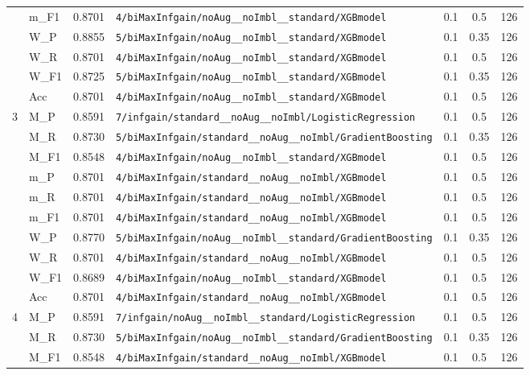 \begin{table}[htbp]
\begin{tabular}{|c|l|c|>{\ttfamily\footnotesize}p{7.2cm}|c|c|c|}
 & m\_F1 & 0.8701 & \texttt{4/biMaxInfgain/noAug\_\_noImbl\_\_standard/XGBmodel} & 0.1 & 0.5  & 126 \\ 
 & W\_P & 0.8855 & \texttt{5/biMaxInfgain/noAug\_\_noImbl\_\_standard/XGBmodel} & 0.1 & 0.35  & 126 \\ 
 & W\_R & 0.8701 & \texttt{4/biMaxInfgain/noAug\_\_noImbl\_\_standard/XGBmodel} & 0.1 & 0.5  & 126 \\ 
 & W\_F1 & 0.8725 & \texttt{5/biMaxInfgain/noAug\_\_noImbl\_\_standard/XGBmodel} & 0.1 & 0.35  & 126 \\ 
 & Acc & 0.8701 & \texttt{4/biMaxInfgain/noAug\_\_noImbl\_\_standard/XGBmodel} & 0.1 & 0.5  & 126 \\ 
\hline
\multirow{10}{*}{3} & M\_P & 0.8591 & \texttt{7/infgain/standard\_\_noAug\_\_noImbl/LogisticRegression} & 0.1 & 0.5  & 126 \\ 
 & M\_R & 0.8730 & \texttt{5/biMaxInfgain/standard\_\_noAug\_\_noImbl/GradientBoosting} & 0.1 & 0.35  & 126 \\ 
 & M\_F1 & 0.8548 & \texttt{4/biMaxInfgain/noAug\_\_noImbl\_\_standard/XGBmodel} & 0.1 & 0.5  & 126 \\ 
 & m\_P & 0.8701 & \texttt{4/biMaxInfgain/standard\_\_noAug\_\_noImbl/XGBmodel} & 0.1 & 0.5  & 126 \\ 
 & m\_R & 0.8701 & \texttt{4/biMaxInfgain/standard\_\_noAug\_\_noImbl/XGBmodel} & 0.1 & 0.5  & 126 \\ 
 & m\_F1 & 0.8701 & \texttt{4/biMaxInfgain/standard\_\_noAug\_\_noImbl/XGBmodel} & 0.1 & 0.5  & 126 \\ 
 & W\_P & 0.8770 & \texttt{5/biMaxInfgain/noAug\_\_noImbl\_\_standard/GradientBoosting} & 0.1 & 0.35  & 126 \\ 
 & W\_R & 0.8701 & \texttt{4/biMaxInfgain/standard\_\_noAug\_\_noImbl/XGBmodel} & 0.1 & 0.5  & 126 \\ 
 & W\_F1 & 0.8689 & \texttt{4/biMaxInfgain/noAug\_\_noImbl\_\_standard/XGBmodel} & 0.1 & 0.5  & 126 \\ 
 & Acc & 0.8701 & \texttt{4/biMaxInfgain/standard\_\_noAug\_\_noImbl/XGBmodel} & 0.1 & 0.5  & 126 \\ 
\hline
\multirow{10}{*}{4} & M\_P & 0.8591 & \texttt{7/infgain/noAug\_\_noImbl\_\_standard/LogisticRegression} & 0.1 & 0.5  & 126 \\ 
 & M\_R & 0.8730 & \texttt{5/biMaxInfgain/noAug\_\_noImbl\_\_standard/GradientBoosting} & 0.1 & 0.35  & 126 \\ 
 & M\_F1 & 0.8548 & \texttt{4/biMaxInfgain/standard\_\_noAug\_\_noImbl/XGBmodel} & 0.1 & 0.5  & 126 \\ 

\end{tabular}
\end{table}
